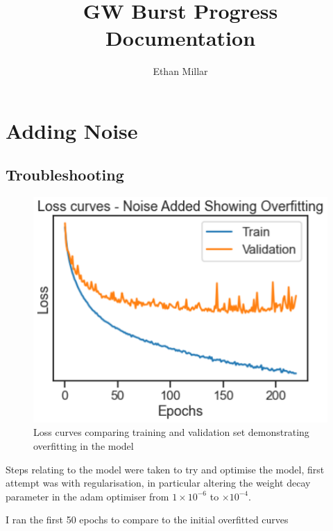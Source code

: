 \documentclass[a4paper, 12pt]{article}
\begin{document}
\title{\textbf{GW Burst Progress Documentation}}
\author{Ethan Millar}
\date{}
\maketitle

\section{Adding Noise}
\subsection{Troubleshooting}

\begin{figure}[H]
  \centering
  \includegraphics[scale = 0.5]{Overfit.PNG}
  \caption{Loss curves comparing training and validation set demonstrating overfitting in the model}
  \label{fig:overfit}
\end{figure}

Steps relating to the model were taken to try and optimise the model, first attempt was with regularisation, in particular altering the weight decay parameter in the adam optimiser from $1 \times 10^{-6}$ to $  \times 10^{-4}$.

I ran the first 50 epochs to compare to the initial overfitted curves
\end{document}
